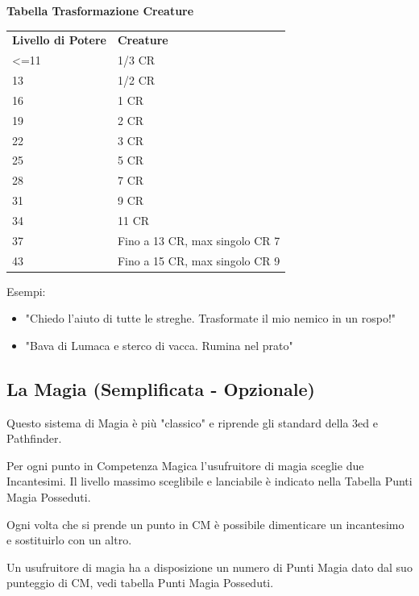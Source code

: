 \documentclass[a4paper,11pt,twoside,openany]{book}
\begin{document}
\bigskip

\textbf{Tabella Trasformazione Creature}
\medskip

\begin{tabularx}{0.95\textwidth}{lX}
	\toprule
	\textbf{Livello di Potere} & \textbf{Creature}\\
	<=11	& 1/3 CR    \\
	13		& 1/2 CR   \\
	16		& 1 CR \\
	19		& 2 CR \\
	22		& 3 CR \\
	25		& 5 CR \\
	28		& 7 CR \\
	31		& 9 CR \\
	34		& 11 CR\\
	37		& Fino a 13 CR, max singolo CR 7\\
	43		& Fino a 15 CR, max singolo CR 9\\
\end{tabularx}

\bigskip


Esempi:
\begin{itemize}
	\item
	 "Chiedo l'aiuto di tutte le streghe. Trasformate il mio nemico in un rospo!"
	\item
	 "Bava di Lumaca e sterco di vacca. Rumina nel prato"
\end{itemize}

\pagebreak



\pagebreak



\pagebreak

\subsection{La Magia (Semplificata - Opzionale)}

Questo sistema di Magia è più "classico" e riprende gli standard della 3ed e Pathfinder.

Per ogni punto in Competenza Magica l'usufruitore di magia sceglie due Incantesimi. Il livello massimo sceglibile e lanciabile è indicato nella Tabella Punti Magia Posseduti.

Ogni volta che si prende un punto in CM è possibile dimenticare un incantesimo e sostituirlo con un altro.

Un usufruitore di magia ha a disposizione un numero di Punti Magia dato dal suo punteggio di CM, vedi tabella Punti Magia Posseduti.
\end{document}
